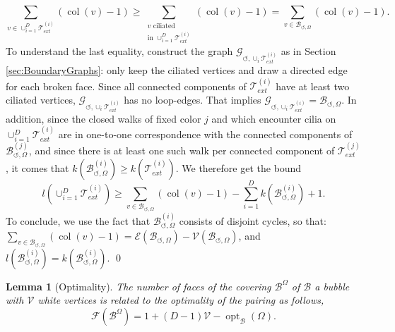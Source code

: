 \documentclass[aps,prd,10pt,notitlepage,nofootinbib,superscriptaddress,showkeys,showpacs]{revtex4-1}
\newtheorem{lemma}{Lemma}
\begin{document}
\begin{equation}
\sum_{v\in\cup_{i=1}^D{\mathcal{T}}_{ext}^{(i)}}(\operatorname{col}(v)-1)\ge\sum_{\substack{ \text{$v$ ciliated}\\\text{in $\cup_{i=1}^D{\mathcal{T}}_{ext}^{(i)}$}}}(\operatorname{col}(v)-1)=\sum_{v\in{\mathcal{B}}_{\circlearrowleft,\Omega}}(\operatorname{col}(v)-1).
\end{equation}
To understand the last equality, construct the graph ${\mathcal{G}}_{\circlearrowleft, \cup_{i}{\mathcal{T}}_{ext}^{(i)}}$ as in Section \ref{sec:BoundaryGraphs}: only keep the ciliated vertices and draw a directed edge for each broken face. Since all connected components of ${\mathcal{T}}_{ext}^{(i)}$ have at least two ciliated vertices, ${\mathcal{G}}_{\circlearrowleft, \cup_{i}{\mathcal{T}}_{ext}^{(i)}}$ has no loop-edges. That implies ${\mathcal{G}}_{\circlearrowleft, \cup_{i}{\mathcal{T}}_{ext}^{(i)}} = {\mathcal{B}}_{\circlearrowleft,\Omega}$. In addition, since the closed walks of fixed color $j$ and which encounter cilia on $\cup_{i=1}^D{\mathcal{T}}_{ext}^{(i)}$ are in one-to-one correspondence with the connected components of ${\mathcal{B}}_{\circlearrowleft,\Omega}^{(j)}$, and since there is at least one such walk per connected component of ${\mathcal{T}}_{ext}^{(j)}$, it comes that $k({\mathcal{B}}_{\circlearrowleft,\Omega}^{(i)})\ge k({\mathcal{T}}_{ext}^{(i)})$. We therefore get the bound
\begin{equation}
\label{eqref:PrfIneq}
l(\cup_{i=1}^D{\mathcal{T}}_{ext}^{(i)})\ge\sum_{v\in{\mathcal{B}}_{\circlearrowleft,\Omega}}(\operatorname{col}(v)-1)-\sum_{i=1}^Dk({\mathcal{B}}_{\circlearrowleft,\Omega}^{(i)})+1.
\end{equation}
To conclude, we use the fact that ${\mathcal{B}}_{\circlearrowleft,\Omega}^{(i)}$ consists of disjoint cycles, so that: $\sum_{v\in{\mathcal{B}}_{\circlearrowleft,\Omega}}(\operatorname{col}(v)-1)={\mathcal{E}}({\mathcal{B}}_{\circlearrowleft,\Omega})-{\mathcal{V}}({\mathcal{B}}_{\circlearrowleft,\Omega})$, and $l({\mathcal{B}}_{\circlearrowleft,\Omega}^{(i)})=k({\mathcal{B}}_{\circlearrowleft,\Omega}^{(i)})$.
\qed
 

\begin{lemma}[Optimality]\label{lemma:OptPow}
The number of faces of the covering ${\mathcal{B}}^\Omega$ of ${\mathcal{B}}$ a bubble with ${\mathcal{V}}$ white vertices is related to the optimality of the pairing as follows,
\begin{equation}
{\mathcal{F}}({\mathcal{B}}^\Omega) = 1 + (D-1){\mathcal{V}} - \operatorname{opt}_{\mathcal{B}}(\Omega).
\end{equation} 
\end{lemma}
\end{document}
